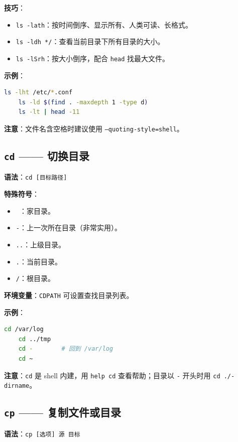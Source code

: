 \textbf{技巧}：
\begin{itemize}
\item \texttt{ls -lath}：按时间倒序、显示所有、人类可读、长格式。
\item \texttt{ls -ldh */}：查看当前目录下所有目录的大小。
\item \texttt{ls -lSrh}：按大小倒序，配合 \texttt{head} 找最大文件。
\end{itemize}

\textbf{示例}：
\begin{lstlisting}[language=bash]
	ls -lht /etc/*.conf
	ls -ld $(find . -maxdepth 1 -type d)
	ls -lt | head -11
\end{lstlisting}

\textbf{注意}：文件名含空格时建议使用 \texttt{--quoting-style=shell}。

\subsection{\texttt{cd} —— 切换目录} \textbf{语法}：\texttt{cd [目标路径]}

\textbf{特殊符号}：
\begin{itemize}
\item \texttt{\string~}：家目录。
\item \texttt{-}：上一次所在目录（非常实用）。
\item \texttt{..}：上级目录。
\item \texttt{.}：当前目录。
\item \texttt{/}：根目录。
\end{itemize}

\textbf{环境变量}：\texttt{CDPATH} 可设置查找目录列表。

\textbf{示例}：
\begin{lstlisting}[language=bash]
	cd /var/log
	cd ../tmp
	cd -        # 回到 /var/log
	cd ~
\end{lstlisting}

\textbf{注意}：\texttt{cd} 是 shell 内建，用 \texttt{help cd} 查看帮助；目录以 \texttt{-} 开头时用 \texttt{cd ./-dirname}。

\subsection{\texttt{cp} —— 复制文件或目录} \textbf{语法}：\texttt{cp [选项] 源 目标}


